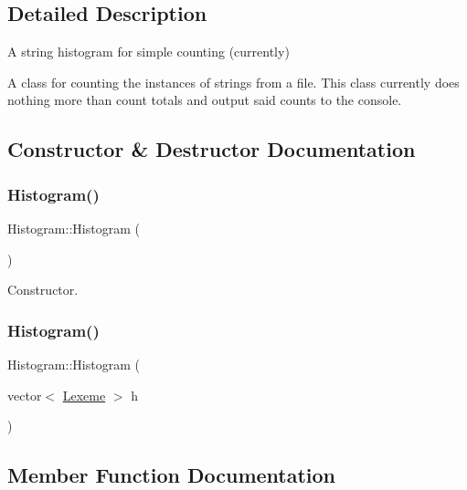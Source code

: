 \subsection{Detailed Description}
A string histogram for simple counting (currently) 

A class for counting the instances of strings from a file. This class currently does nothing more than count totals and output said counts to the console. 

\subsection{Constructor \& Destructor Documentation}
\mbox{\label{class_histogram_af681f293852ac145f867ecfcce3062a5}} 
\subsubsection{\texorpdfstring{Histogram()}{Histogram()}\hspace{0.1cm}{\footnotesize\ttfamily [1/2]}}
{\footnotesize\ttfamily Histogram\+::\+Histogram (\begin{DoxyParamCaption}{ }\end{DoxyParamCaption})\hspace{0.3cm}{\ttfamily [inline]}}



Constructor. 

\mbox{\label{class_histogram_a5e56d61b85862889a024c1a682981964}} 
\subsubsection{\texorpdfstring{Histogram()}{Histogram()}\hspace{0.1cm}{\footnotesize\ttfamily [2/2]}}
{\footnotesize\ttfamily Histogram\+::\+Histogram (\begin{DoxyParamCaption}\item[{vector$<$ \hyperlink{class_lexeme}{Lexeme} $>$}]{h }\end{DoxyParamCaption})\hspace{0.3cm}{\ttfamily [inline]}}



\subsection{Member Function Documentation}
\mbox{\label{class_histogram_af4fdfc3e8e4c4028deaf9b663ee5832c}} 

